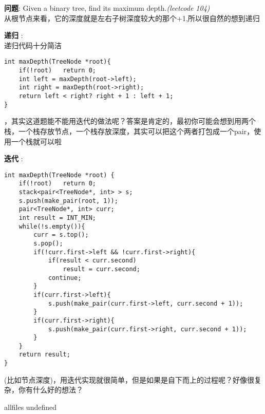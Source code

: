 \documentclass{article}
\begin{document}
\begin{CJK}{UTF8}{gbsn}     %

\else
	
\begin{description}
	\item{\textbf{问题}}: Given a binary tree, find its maximum depth.\textit{(leetcode 104)}
	\\从根节点来看，它的深度就是左右子树深度较大的那个+1,所以很自然的想到递归
	\item{\textbf{递归}} : 
	\\递归代码十分简洁
	\begin{lstlisting}
int maxDepth(TreeNode *root){
	if(!root)   return 0;
	int left = maxDepth(root->left);
	int right = maxDepth(root->right);
	return left < right? right + 1 : left + 1;
}
	\end{lstlisting}
	，其实这道题能不能用迭代的做法呢？答案是肯定的，最初你可能会想到用两个栈，一个栈存放节点，一个栈存放深度，其实可以把这个两者打包成一个pair，使用一个栈就可以啦
	\item{\textbf{迭代}} : 
	\begin{lstlisting}
int maxDepth(TreeNode *root) {
	if(!root)	return 0;
	stack<pair<TreeNode*, int> > s;
	s.push(make_pair(root, 1));
	pair<TreeNode*, int> curr;
	int result = INT_MIN;
	while(!s.empty()){
		curr = s.top();
		s.pop();
		if(!curr.first->left && !curr.first->right){
			if(result < curr.second)
				result = curr.second;
			continue;
		}
		if(curr.first->left){
			s.push(make_pair(curr.first->left, curr.second + 1));
		}
		if(curr.first->right){
			s.push(make_pair(curr.first->right, curr.second + 1));
		}
	}
	return result;
}
	\end{lstlisting}
	(比如节点深度)，用迭代实现就很简单，但是如果是自下而上的过程呢？好像很复杂，你有什么好的想法？
\end{description}

\fi

\ifx allfiles undefined
\end{CJK}
\end{document}
